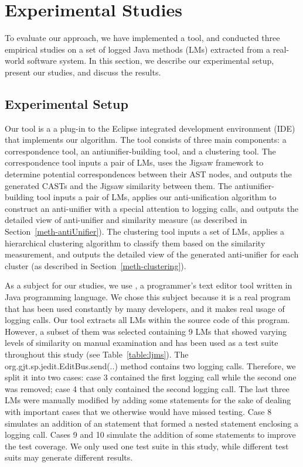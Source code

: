 
\chapter{Experimental Studies}  \label{studies}
To evaluate our approach, we have implemented a tool, and conducted three empirical studies on a set of logged Java methods (LMs) extracted from a real-world software system. In this section, we describe our experimental setup, present our studies, and discuss the results.

\section{Experimental Setup}  \label{experimental_setup}
Our tool is a a plug-in to the Eclipse integrated development environment (IDE) that implements our algorithm. The tool consists of three main components: a correspondence tool, an antiunifier-building tool, and a clustering tool. The correspondence tool inputs a pair of LMs, uses the Jigsaw framework to determine potential correspondences between their AST nodes, and outputs the generated CASTs and the Jigsaw similarity between them. The antiunifier-building tool inputs a pair of LMs, applies our anti-unification algorithm to construct an anti-unifier with a special attention to logging calls, and outputs the detailed view of anti-unifier and similarity measure (as described in Section~\ref{meth-antiUnifier}). The clustering tool inputs a set of LMs, applies a hierarchical clustering algorithm to classify them based on the similarity measurement, and outputs the detailed view of the generated anti-unifier for each cluster (as described in Section~\ref{meth-clustering}).

As a subject for our studies, we use , a programmer’s text editor tool written in Java programming language. We chose this subject because it is a real program that has been used constantly by many developers, and it makes real usage of logging calls.
Our tool extracts all LMs within the source code of this program. However, a subset of them was selected containing 9 LMs that showed varying levels of similarity on manual examination and has been used as a test suite throughout this study (see Table~\ref{table:ljms}). The org.gjt.sp.jedit.EditBus.send(..) method contains two logging calls. Therefore, we split it into two cases: case 3 contained the first logging call while the second one was removed; case 4 that only contained the second logging call. The last three LMs were manually modified by adding some statements for the sake of dealing with important cases that we otherwise would have missed testing. Case 8 simulates an addition of an statement that formed a nested statement enclosing a logging call. Cases 9 and 10 simulate the addition of some statements to improve the test coverage.
We only used one test suite in this study, while different test suits may generate different results.


